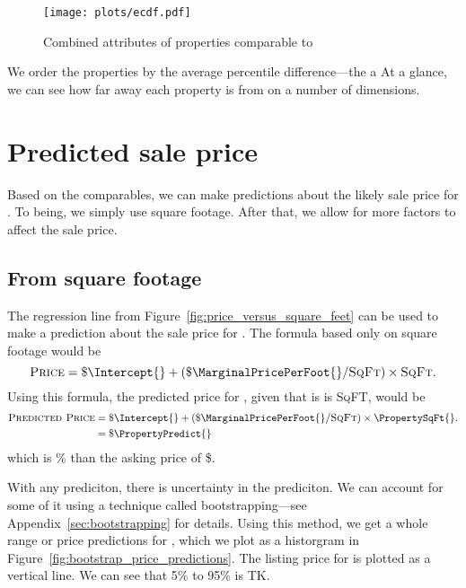 \documentclass[
12pt, %
letterpaper, %
oneside, %
headinclude,footinclude, %
BCOR5mm, %
]{scrartcl}
\begin{document}
\begin{figure}
\centering
\caption{Combined attributes of properties comparable to \PropertyName{}} \label{fig:ecdf}  
\texttt{[image: plots/ecdf.pdf]} 
\end{figure}

We order the properties by the average percentile difference---the a
At a glance, we can see how far away each property is from \PropertyName{} on a number of dimensions. 

\section{Predicted sale price}
Based on the comparables, we can make predictions about the likely sale price for \PropertyName{}. 
To being, we simply use square footage.
After that, we allow for more factors to affect the sale price.

\subsection{From square footage}

The regression line from Figure~\ref{fig:price_versus_square_feet} can be used to make a prediction about the sale price for \PropertyName{}. 
The formula based only on square footage would be
\begin{equation}
  \textsc{Price} = \$ \Intercept{} + (\$ \MarginalPricePerFoot{}/\textsc{SqFt}) \times \textsc{SqFt}. \nonumber
\end{equation}
Using this formula, the predicted price for \PropertyName{}, given that is is \PropertySqFt{} \textsc{SqFT}, would be
\begin{align}
\textsc{Predicted Price} & = \$ \Intercept{} + (\$ \MarginalPricePerFoot{}/\textsc{SqFt}) \times \PropertySqFt{}. \\ \nonumber
                         & = \$ \PropertyPredict{} \nonumber 
\end{align}
which is \PctDiff{}\% \ComparePredictedToActual{} than the asking price of \$\PropertyPrice{}.

With any prediciton, there is uncertainty in the prediciton.
We can account for some of it using a technique called bootstrapping---see Appendix~\ref{sec:bootstrapping} for details. 
Using this method, we get a whole range or price predictions for \PropertyName{}, which we plot as a historgram in Figure~\ref{fig:bootstrap_price_predictions}.
The listing price for \PropertyName{} is plotted as a vertical line. 
We can see that 5\% to 95\% is TK.
\end{document}
